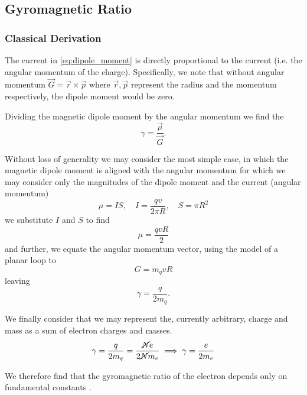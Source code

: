 \subsection{Gyromagnetic Ratio}
\subsubsection{Classical Derivation}
The current in \eqref{eq:dipole_moment} is directly proportional to the current (i.e. the angular momentum of the charge). Specifically, we note that without angular momentum $\vec{G} = \vec{r} \times \vec{p}$ where $\vec{r}, \vec{p}$ represent the radius and the momentum respectively, the dipole moment would be zero.

Dividing the magnetic dipole moment by the angular momentum we find the \textbf{} \cite{Chen2020}
\begin{equation}
    \gamma = \frac{\vec{\mu}}{\vec{G}}.
    \label{eq:gyromagnetic_ratio}
\end{equation}

Without loss of generality we may consider the most simple case, in which the magnetic dipole moment is aligned with the angular momentum for which we may consider only the magnitudes of the dipole moment and the current (angular momentum)
\begin{equation}
    \mu = IS, \quad I = 
    \frac{qv}{2\pi R},
    \quad S = \pi R^2 
\end{equation}
we substitute $I$ and $S$ to find 
\begin{equation}
    \mu = \frac{qvR}{2}
\end{equation}
and further, we equate the angular momentum vector, using the model of a planar loop to 
\begin{equation}
   G= m_q v R 
\end{equation}
leaving 
\begin{equation}
    \gamma = \frac{q}{2m_q } . 
\end{equation}

We finally consider that we may represent the, currently arbitrary, charge and mass as a sum of electron charges and masses. 
\begin{equation}
    \gamma = \frac{q}{2m_q } = \frac{\cancel{N}e}{2\cancel{N} m_e} \implies \gamma = \frac{e}{2 m_e}
    \label{eq:gyromagnetic_ratio_electrons}
\end{equation}

We therefore find that the gyromagnetic ratio of the electron depends only on fundamental constants \cite{bromley2000quantum}.



